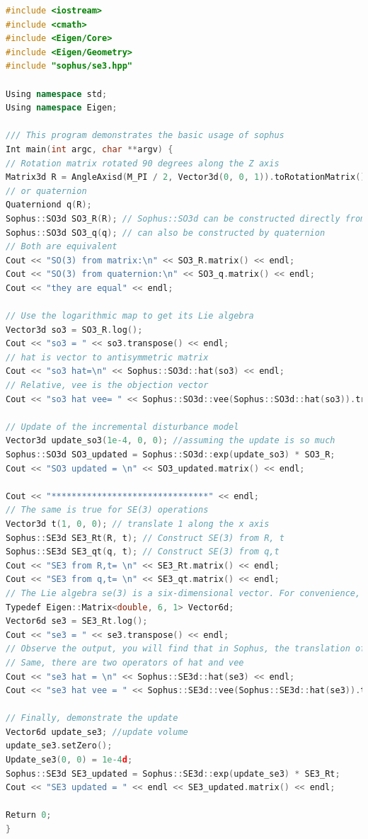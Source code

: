 \begin{lstlisting}[language=c++,caption=slambook/ch4/useSophus.cpp]
#include <iostream>
#include <cmath>
#include <Eigen/Core>
#include <Eigen/Geometry>
#include "sophus/se3.hpp"

Using namespace std;
Using namespace Eigen;

/// This program demonstrates the basic usage of sophus
Int main(int argc, char **argv) {
// Rotation matrix rotated 90 degrees along the Z axis
Matrix3d R = AngleAxisd(M_PI / 2, Vector3d(0, 0, 1)).toRotationMatrix();
// or quaternion
Quaterniond q(R);
Sophus::SO3d SO3_R(R); // Sophus::SO3d can be constructed directly from the rotation matrix
Sophus::SO3d SO3_q(q); // can also be constructed by quaternion
// Both are equivalent
Cout << "SO(3) from matrix:\n" << SO3_R.matrix() << endl;
Cout << "SO(3) from quaternion:\n" << SO3_q.matrix() << endl;
Cout << "they are equal" << endl;

// Use the logarithmic map to get its Lie algebra
Vector3d so3 = SO3_R.log();
Cout << "so3 = " << so3.transpose() << endl;
// hat is vector to antisymmetric matrix
Cout << "so3 hat=\n" << Sophus::SO3d::hat(so3) << endl;
// Relative, vee is the objection vector
Cout << "so3 hat vee= " << Sophus::SO3d::vee(Sophus::SO3d::hat(so3)).transpose() << endl;

// Update of the incremental disturbance model
Vector3d update_so3(1e-4, 0, 0); //assuming the update is so much
Sophus::SO3d SO3_updated = Sophus::SO3d::exp(update_so3) * SO3_R;
Cout << "SO3 updated = \n" << SO3_updated.matrix() << endl;

Cout << "*******************************" << endl;
// The same is true for SE(3) operations
Vector3d t(1, 0, 0); // translate 1 along the x axis
Sophus::SE3d SE3_Rt(R, t); // Construct SE(3) from R, t
Sophus::SE3d SE3_qt(q, t); // Construct SE(3) from q,t
Cout << "SE3 from R,t= \n" << SE3_Rt.matrix() << endl;
Cout << "SE3 from q,t= \n" << SE3_qt.matrix() << endl;
// The Lie algebra se(3) is a six-dimensional vector. For convenience, typedef is used first.
Typedef Eigen::Matrix<double, 6, 1> Vector6d;
Vector6d se3 = SE3_Rt.log();
Cout << "se3 = " << se3.transpose() << endl;
// Observe the output, you will find that in Sophus, the translation of se(3) is in front and the rotation is in the back.
// Same, there are two operators of hat and vee
Cout << "se3 hat = \n" << Sophus::SE3d::hat(se3) << endl;
Cout << "se3 hat vee = " << Sophus::SE3d::vee(Sophus::SE3d::hat(se3)).transpose() << endl;

// Finally, demonstrate the update
Vector6d update_se3; //update volume
update_se3.setZero();
Update_se3(0, 0) = 1e-4d;
Sophus::SE3d SE3_updated = Sophus::SE3d::exp(update_se3) * SE3_Rt;
Cout << "SE3 updated = " << endl << SE3_updated.matrix() << endl;

Return 0;
}
\end{lstlisting}

